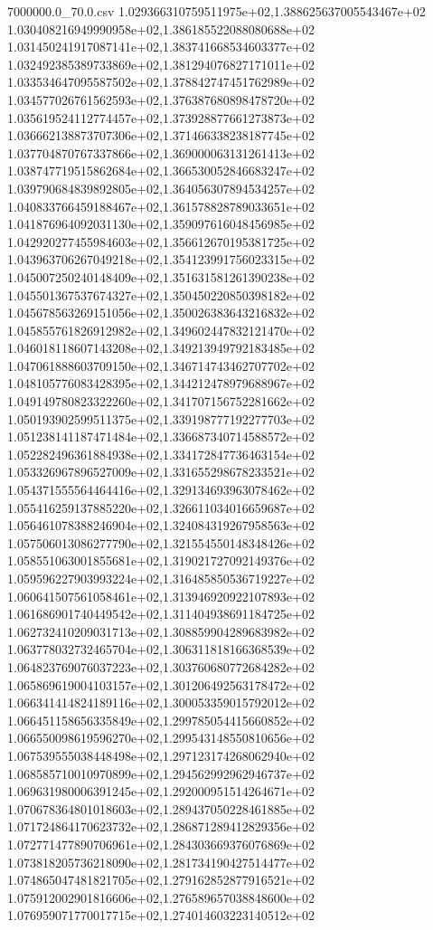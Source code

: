 \begin{filecontents*}{7000000.0_70.0.csv}
1.029366310759511975e+02,1.388625637005543467e+02
1.030408216949990958e+02,1.386185522088080688e+02
1.031450241917087141e+02,1.383741668534603377e+02
1.032492385389733869e+02,1.381294076827171011e+02
1.033534647095587502e+02,1.378842747451762989e+02
1.034577026761562593e+02,1.376387680898478720e+02
1.035619524112774457e+02,1.373928877661273873e+02
1.036662138873707306e+02,1.371466338238187745e+02
1.037704870767337866e+02,1.369000063131261413e+02
1.038747719515862684e+02,1.366530052846683247e+02
1.039790684839892805e+02,1.364056307894534257e+02
1.040833766459188467e+02,1.361578828789033651e+02
1.041876964092031130e+02,1.359097616048456985e+02
1.042920277455984603e+02,1.356612670195381725e+02
1.043963706267049218e+02,1.354123991756023315e+02
1.045007250240148409e+02,1.351631581261390238e+02
1.045501367537674327e+02,1.350450220850398182e+02
1.045678563269151056e+02,1.350026383643216832e+02
1.045855761826912982e+02,1.349602447832121470e+02
1.046018118607143208e+02,1.349213949792183485e+02
1.047061888603709150e+02,1.346714743462707702e+02
1.048105776083428395e+02,1.344212478979688967e+02
1.049149780823322260e+02,1.341707156752281662e+02
1.050193902599511375e+02,1.339198777192277703e+02
1.051238141187471484e+02,1.336687340714588572e+02
1.052282496361884938e+02,1.334172847736463154e+02
1.053326967896527009e+02,1.331655298678233521e+02
1.054371555564464416e+02,1.329134693963078462e+02
1.055416259137885220e+02,1.326611034016659687e+02
1.056461078388246904e+02,1.324084319267958563e+02
1.057506013086277790e+02,1.321554550148348426e+02
1.058551063001855681e+02,1.319021727092149376e+02
1.059596227903993224e+02,1.316485850536719227e+02
1.060641507561058461e+02,1.313946920922107893e+02
1.061686901740449542e+02,1.311404938691184725e+02
1.062732410209031713e+02,1.308859904289683982e+02
1.063778032732465704e+02,1.306311818166368539e+02
1.064823769076037223e+02,1.303760680772684282e+02
1.065869619004103157e+02,1.301206492563178472e+02
1.066341414824189116e+02,1.300053359015792012e+02
1.066451158656335849e+02,1.299785054415660852e+02
1.066550098619596270e+02,1.299543148550810656e+02
1.067539555038448498e+02,1.297123174268062940e+02
1.068585710010970899e+02,1.294562992962946737e+02
1.069631980006391245e+02,1.292000951514264671e+02
1.070678364801018603e+02,1.289437050228461885e+02
1.071724864170623732e+02,1.286871289412829356e+02
1.072771477890706961e+02,1.284303669376076869e+02
1.073818205736218090e+02,1.281734190427514477e+02
1.074865047481821705e+02,1.279162852877916521e+02
1.075912002901816606e+02,1.276589657038848600e+02
1.076959071770017715e+02,1.274014603223140512e+02

\end{filecontents*}
